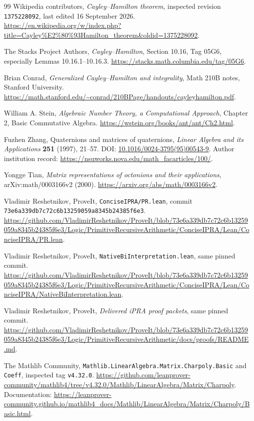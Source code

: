 \documentclass[11pt,letterpaper]{article}
\theoremstyle{remark}
\numberwithin{equation}{section}
\begin{document}
\begin{thebibliography}{99}
Wikipedia contributors, \emph{Cayley--Hamilton theorem}, inspected
revision \texttt{1375228092}, last edited 16 September 2026.
\url{https://en.wikipedia.org/w/index.php?title=Cayley%E2%80%93Hamilton_theorem&oldid=1375228092}.

The Stacks Project Authors, \emph{Cayley--Hamilton}, Section 10.16,
Tag 05G6, especially Lemmas 10.16.1--10.16.3.
\url{https://stacks.math.columbia.edu/tag/05G6}.

Brian Conrad, \emph{Generalized Cayley--Hamilton and integrality},
Math 210B notes, Stanford University.
\url{https://math.stanford.edu/~conrad/210BPage/handouts/cayleyhamilton.pdf}.

William A. Stein, \emph{Algebraic Number Theory, a Computational Approach},
Chapter 2, Basic Commutative Algebra.
\url{https://wstein.org/books/ant/ant/Ch2.html}.

Fuzhen Zhang, Quaternions and matrices of quaternions,
\emph{Linear Algebra and its Applications} \textbf{251} (1997), 21--57.
DOI: \href{https://doi.org/10.1016/0024-3795(95)00543-9}{10.1016/0024-3795(95)00543-9}.
Author institution record:
\url{https://nsuworks.nova.edu/math_facarticles/100/}.

Yongge Tian, \emph{Matrix representations of octonions and their
applications}, arXiv:math/0003166v2 (2000).
\url{https://arxiv.org/abs/math/0003166v2}.

Vladimir Reshetnikov, ProveIt, \texttt{ConciseIPRA/PR.lean},
commit \texttt{73e6a339db7c72c6b13259059a8345b24385f6e3}.
\url{https://github.com/VladimirReshetnikov/ProveIt/blob/73e6a339db7c72c6b13259059a8345b24385f6e3/Logic/PrimitiveRecursiveArithmetic/ConciseIPRA/Lean/ConciseIPRA/PR.lean}.

Vladimir Reshetnikov, ProveIt, \texttt{NativeBiInterpretation.lean},
same pinned commit.
\url{https://github.com/VladimirReshetnikov/ProveIt/blob/73e6a339db7c72c6b13259059a8345b24385f6e3/Logic/PrimitiveRecursiveArithmetic/ConciseIPRA/Lean/ConciseIPRA/NativeBiInterpretation.lean}.

Vladimir Reshetnikov, ProveIt, \emph{Delivered iPRA proof packets},
same pinned commit.
\url{https://github.com/VladimirReshetnikov/ProveIt/blob/73e6a339db7c72c6b13259059a8345b24385f6e3/Logic/PrimitiveRecursiveArithmetic/docs/proofs/README.md}.

The Mathlib Community, \texttt{Mathlib.LinearAlgebra.Matrix.Charpoly.Basic}
and \texttt{Coeff}, inspected tag \texttt{v4.32.0}.
\url{https://github.com/leanprover-community/mathlib4/tree/v4.32.0/Mathlib/LinearAlgebra/Matrix/Charpoly}.
Documentation:
\url{https://leanprover-community.github.io/mathlib4_docs/Mathlib/LinearAlgebra/Matrix/Charpoly/Basic.html}.
\end{thebibliography}
\end{document}
